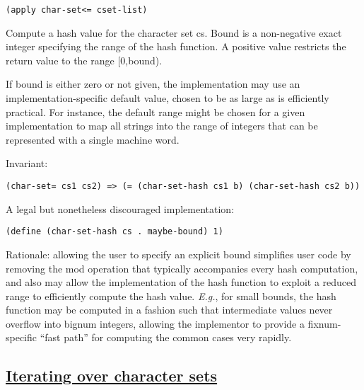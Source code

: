 \begin{description}
\begin{verbatim}
(apply char-set<= cset-list)
\end{verbatim}
\item[ \href{}{} \texttt{char-set-hash} cs {[}bound{]} -\textgreater{}
integer ]
Compute a hash value for the character set cs. Bound is a non-negative
exact integer specifying the range of the hash function. A positive
value restricts the return value to the range {[}0,bound).

If bound is either zero or not given, the implementation may use an
implementation-specific default value, chosen to be as large as is
efficiently practical. For instance, the default range might be chosen
for a given implementation to map all strings into the range of integers
that can be represented with a single machine word.

Invariant:

\begin{verbatim}
(char-set= cs1 cs2) => (= (char-set-hash cs1 b) (char-set-hash cs2 b))
\end{verbatim}

A legal but nonetheless discouraged implementation:

\begin{verbatim}
(define (char-set-hash cs . maybe-bound) 1)
\end{verbatim}

Rationale: allowing the user to specify an explicit bound simplifies
user code by removing the mod operation that typically accompanies every
hash computation, and also may allow the implementation of the hash
function to exploit a reduced range to efficiently compute the hash
value. \emph{E.g.}, for small bounds, the hash function may be computed
in a fashion such that intermediate values never overflow into bignum
integers, allowing the implementor to provide a fixnum-specific ``fast
path'' for computing the common cases very rapidly.
\end{description}

\subsection{\texorpdfstring{\href{}{Iterating over character
sets}}{Iterating over character sets}}\label{iterating-over-character-sets}

